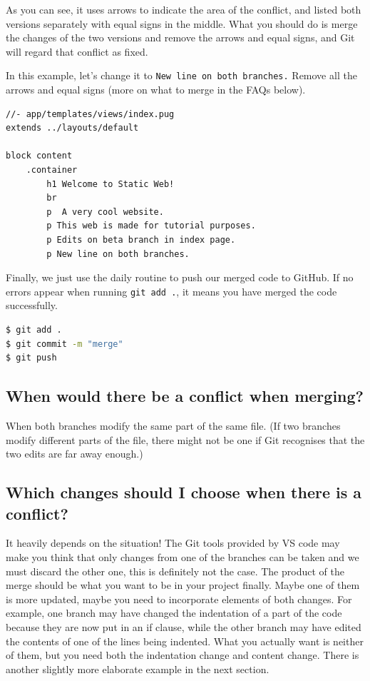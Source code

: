 As you can see, it uses arrows to indicate the area of the conflict, and listed both versions separately with equal signs in the middle. What you should do is merge the changes of the two versions and remove the arrows and equal signs, and Git will regard that conflict as fixed. 

In this example, let's change it to \texttt{New line on both branches.} Remove all the arrows and equal signs (more on what to merge in the FAQs below).

\begin{lstlisting}[language=pug]
//- app/templates/views/index.pug
extends ../layouts/default

block content
	.container
		h1 Welcome to Static Web!
		br
		p  A very cool website.
		p This web is made for tutorial purposes.
		p Edits on beta branch in index page.
		p New line on both branches.
\end{lstlisting}

Finally, we just use the daily routine to push our merged code to GitHub. If no errors appear when running \texttt{git add .}, it means you have merged the code successfully.

\begin{lstlisting}[language=bash]
$ git add .
$ git commit -m "merge"
$ git push
\end{lstlisting}

\subsection*{When would there be a conflict when merging?}

When both branches modify the same part of the same file. (If two branches modify different parts of the file, there might not be one if Git recognises that the two edits are far away enough.)

\subsection*{Which changes should I choose when there is a conflict?}
\label{sec:mergefaq}
It heavily depends on the situation! The Git tools provided by VS code may make you think that only changes from one of the branches can be taken and we must discard the other one, this is definitely not the case. The product of the merge should be what you want to be in your project finally. Maybe one of them is more updated, maybe you need to incorporate elements of both changes. For example, one branch may have changed the indentation of a part of the code because they are now put in an if clause, while the other branch may have edited the contents of one of the lines being indented. What you actually want is neither of them, but you need both the indentation change and content change. There is another slightly more elaborate example in the next section.

